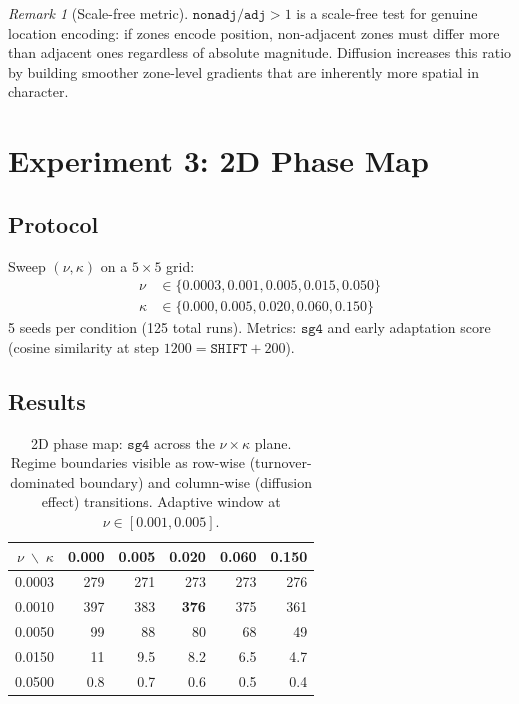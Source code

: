 \documentclass[11pt]{article}
\theoremstyle{remark}
\newtheorem{remark}[theorem]{Remark}
\begin{document}
\begin{remark}[Scale-free metric]
$\mathtt{nonadj/adj} > 1$ is a scale-free test for genuine location encoding:
if zones encode position, non-adjacent zones must differ more than adjacent ones
regardless of absolute magnitude. Diffusion increases this ratio by building
smoother zone-level gradients that are inherently more spatial in character.
\end{remark}

\section{Experiment 3: 2D Phase Map}

\subsection{Protocol}

Sweep $(\nu, \kappa)$ on a $5 \times 5$ grid:
\begin{align*}
\nu &\in \{0.0003, 0.001, 0.005, 0.015, 0.050\} \\
\kappa &\in \{0.000, 0.005, 0.020, 0.060, 0.150\}
\end{align*}
5 seeds per condition (125 total runs). Metrics: $\mathtt{sg4}$ and early
adaptation score (cosine similarity at step $1200 = \mathtt{SHIFT} + 200$).

\subsection{Results}

\begin{table}[h]
\centering
\caption{2D phase map: $\mathtt{sg4}$ across the $\nu \times \kappa$ plane.
Regime boundaries visible as row-wise (turnover-dominated boundary) and column-wise
(diffusion effect) transitions. Adaptive window at $\nu \in [0.001, 0.005]$.}
\label{tab:exp3}
\begin{tabular}{r|rrrrr}
\toprule
$\nu \;\backslash\; \kappa$ & 0.000 & 0.005 & 0.020 & 0.060 & 0.150 \\
\midrule
0.0003 & 279 & 271 & 273 & 273 & 276 \\
0.0010 & 397 & 383 & \textbf{376} & 375 & 361 \\
0.0050 & 99  & 88  & 80  & 68  & 49  \\
0.0150 & 11  & 9.5 & 8.2 & 6.5 & 4.7 \\
0.0500 & 0.8 & 0.7 & 0.6 & 0.5 & 0.4 \\
\bottomrule
\end{tabular}
\end{table}
\end{document}
